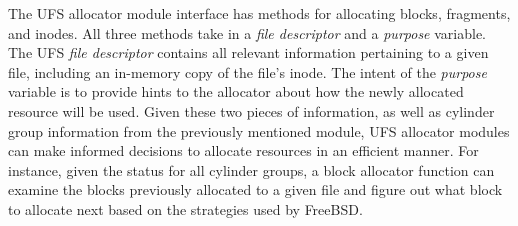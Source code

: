 The UFS allocator module interface has methods for allocating blocks,
fragments, and inodes. All three methods take in a \emph{file descriptor} and a
\emph{purpose} variable. The UFS \emph{file descriptor} contains all relevant
information pertaining to a given file, including an in-memory copy of the
file's inode. The intent of the \emph{purpose} variable is to provide hints to
the allocator about how the newly allocated resource will be used.  Given these
two pieces of information, as well as cylinder group information from the
previously mentioned module, UFS allocator modules can make informed decisions
to allocate resources in an efficient manner. For instance, given the status
for all cylinder groups, a block allocator function can examine the blocks
previously allocated to a given file and figure out what block to allocate next
based on the strategies used by FreeBSD.
